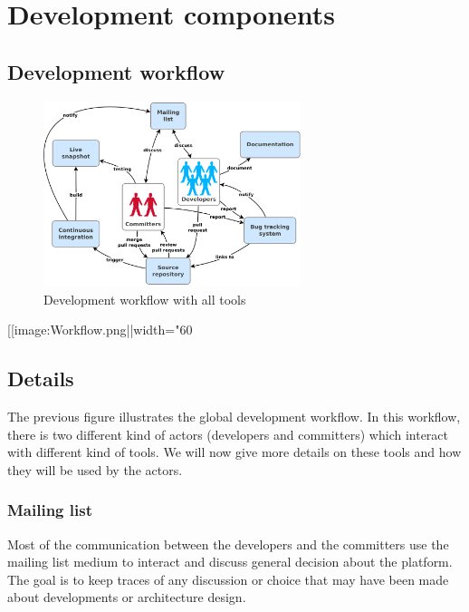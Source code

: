 \chapter{Development components}
\label{ch:development-components}

\section{Development workflow}
\label{sec:development-workflow}


\begin{figure}
\centering
\includegraphics[width=0.67\textwidth]{images/development-workflow.png}
\caption{Development workflow with all tools}
\label{fig:development-worflow}
\end{figure}
[[image:Workflow.png||width="60%

\section{Details}
\label{sec:details}

The previous figure illustrates the global development workflow.  In this workflow, there is two different kind of actors (developers and committers) which interact with different kind of tools.  We will now give more details on these tools and how they will be used by the actors.

\subsection{Mailing list}
\label{sec:mailing-list}

Most of the communication between the developers and the committers use the mailing list medium to interact and discuss general decision about the platform.  The goal is to keep traces of any discussion or choice that may have been made about developments or architecture design.

